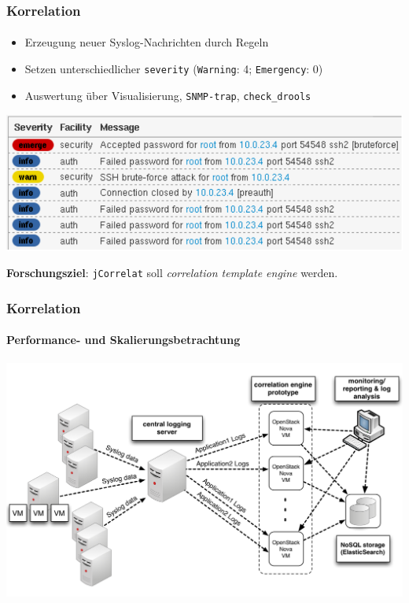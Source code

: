 \begin{frame}
\frametitle{Korrelation}
\framesubtitle{}

\begin{itemize}
    \item Erzeugung neuer Syslog-Nachrichten durch Regeln
    \item Setzen unterschiedlicher \texttt{severity} (\texttt{Warning}: 4; 
    \texttt{Emergency}: 0)
    \item Auswertung über Visualisierung, \texttt{SNMP-trap}, \texttt{check\_drools}
\end{itemize}

\begin{center}
    \includegraphics[scale=0.40]{img/correlat-ui.png}
\end{center}

\textbf{Forschungsziel}: \texttt{jCorrelat} soll \textit{correlation template engine} 
werden.

\end{frame}


\begin{frame}
\frametitle{Korrelation}
\framesubtitle{Performance- und Skalierungsbetrachtung}

\begin{center}
    \includegraphics[scale=0.3]{img/schema_correlat-00.png}
\end{center}

\end{frame}


